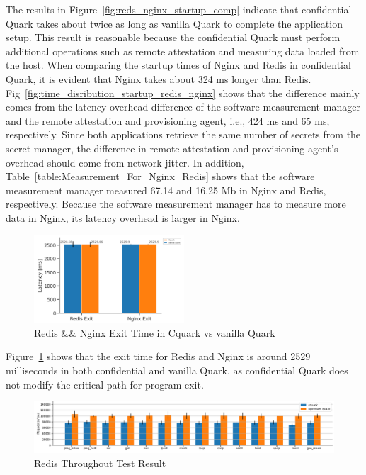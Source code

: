 The results in Figure~\ref{fig:reds_nginx_startup_comp} indicate that confidential Quark takes about twice as long as vanilla Quark to complete the application setup. This result is reasonable because the confidential Quark must perform additional operations such as remote attestation and 
measuring data loaded from the host. When comparing the startup times of Nginx and Redis in confidential Quark, it is evident that Nginx takes about 324 ms longer than Redis. Fig~\ref{fig:time_disribution_startup_redis_nginx} shows that the difference mainly comes from the latency overhead 
difference of the software measurement manager and the remote attestation and provisioning agent, i.e., 424 ms and 65 ms, respectively. Since both applications retrieve the same number of secrets from the secret manager, the difference in remote attestation and provisioning 
agent's overhead should come from network jitter. In addition, Table~\ref{table:Measurement_For_Nginx_Redis} shows that the software measurement manager measured 67.14 and 16.25 Mb in Nginx and Redis, respectively. Because the software measurement manager has to measure more data in 
Nginx, its latency overhead is larger in Nginx. 

\begin{figure}[!htb]
  \centering
  \includegraphics[width=0.5\textwidth]{images/reds_nginx_exit_comp.PNG}
  \caption[Redis \&\& Nginx Exit Time in Cquark vs vanilla Quark]{Redis \&\& Nginx Exit Time in Cquark vs vanilla Quark}
  \label{fig:reds_nginx_exit_comp}
\end{figure}
Figure~\ref{fig:reds_nginx_exit_comp} shows that the exit time for Redis and Nginx is around 2529 milliseconds in both confidential and vanilla Quark, as confidential Quark does not modify the critical path for program exit.
\begin{figure}[!htb]
  \centering
  \includegraphics[width=1\textwidth]{images/redis_throughput.PNG}
  \caption[Redis Throughout Test]{Redis Throughout Test Result}
  \label{fig:redis_throughput}
\end{figure}


